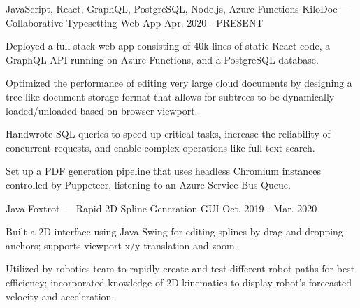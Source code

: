 
\begin{cventries}
  \cventry
  {JavaScript, React, GraphQL, PostgreSQL, Node.js, Azure Functions} %
  {KiloDoc --- Collaborative Typesetting Web App} %
  {} %
  {Apr. 2020 - PRESENT} %
  {
    \begin{cvitems} %
      \item {Deployed a full-stack web app consisting of 40k lines of static React code, a GraphQL API running on Azure Functions, and a PostgreSQL database.}
      \item {Optimized the performance of editing very large cloud documents by designing a tree-like document storage format that allows for subtrees to be dynamically loaded/unloaded based on browser viewport.}
      \item {Handwrote SQL queries to speed up critical tasks, increase the reliability of concurrent requests, and enable complex operations like full-text search.}
      \item {Set up a PDF generation pipeline that uses headless Chromium instances controlled by Puppeteer, listening to an Azure Service Bus Queue.}
    \end{cvitems}
  }

  \cventry
  {Java} %
  {Foxtrot --- Rapid 2D Spline Generation GUI} %
  {} %
  {Oct. 2019 - Mar. 2020} %
  {
    \begin{cvitems} %
      \item {Built a 2D interface using Java Swing for editing splines by drag-and-dropping anchors; supports viewport x/y translation and zoom.}
      \item {Utilized by robotics team to rapidly create and test different robot paths for best efficiency; incorporated knowledge of 2D kinematics to display robot's forecasted velocity and acceleration.}
    \end{cvitems}
  }
\end{cventries}
